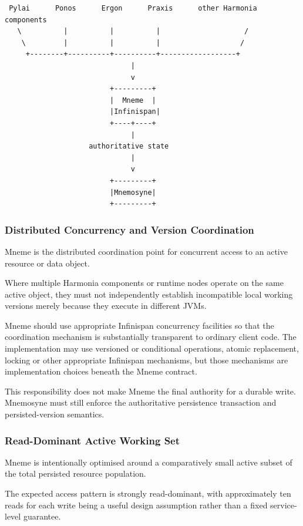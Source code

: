 \begin{verbatim}
 Pylai      Ponos      Ergon      Praxis      other Harmonia components
   \          |          |          |                    /
    \         |          |          |                   /
     +--------+----------+----------+------------------+
                              |
                              v
                         +---------+
                         |  Mneme  |
                         |Infinispan|
                         +----+----+
                              |
                    authoritative state
                              |
                              v
                         +---------+
                         |Mnemosyne|
                         +---------+
\end{verbatim}

\subsubsection{Distributed Concurrency and Version Coordination}

Mneme is the distributed coordination point for concurrent access to an active resource or data object.

Where multiple Harmonia components or runtime nodes operate on the same active object, they must not independently establish incompatible local working versions merely because they execute in different JVMs.

Mneme should use appropriate Infinispan concurrency facilities so that the coordination mechanism is substantially transparent to ordinary client code. The implementation may use versioned or conditional operations, atomic replacement, locking or other appropriate Infinispan mechanisms, but those mechanisms are implementation choices beneath the Mneme contract.

This responsibility does not make Mneme the final authority for a durable write. Mnemosyne must still enforce the authoritative persistence transaction and persisted-version semantics.

\subsubsection{Read-Dominant Active Working Set}

Mneme is intentionally optimised around a comparatively small active subset of the total persisted resource population.

The expected access pattern is strongly read-dominant, with approximately ten reads for each write being a useful design assumption rather than a fixed service-level guarantee.

